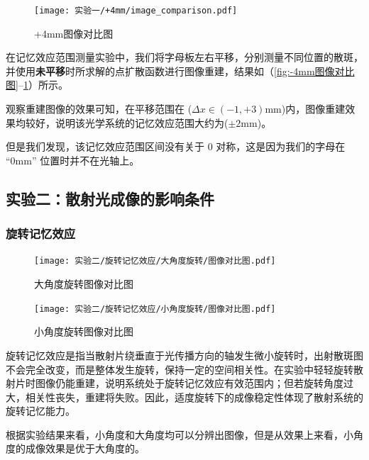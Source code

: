   \begin{figure}[H]
      \centering
      \texttt{[image: 实验一/+4mm/image\_comparison.pdf]}
      \caption{+4mm图像对比图}
      \label{fig:+4mm图像对比图}
  \end{figure}


  在记忆效应范围测量实验中，我们将字母板左右平移，分别测量不同位置的散斑，并使用\textbf{未平移}时所求解的点扩散函数进行图像重建，结果如（\cref{fig:-4mm图像对比图}--\cref{fig:+4mm图像对比图}）所示。

  观察重建图像的效果可知，在平移范围在 ($\Delta x \in (-1, +3) $mm)内，图像重建效果均较好，说明该光学系统的记忆效应范围大约为($\pm 2$mm)。

  但是我们发现，该记忆效应范围区间没有关于 0 对称，这是因为我们的字母在 “0mm” 位置时并不在光轴上。





\subsection{实验二：散射光成像的影响条件}

\subsubsection{旋转记忆效应}
  \begin{figure}[H]
      \centering
      \texttt{[image: 实验二/旋转记忆效应/大角度旋转/图像对比图.pdf]}
      \caption{大角度旋转图像对比图}
  \end{figure}

  \begin{figure}[H]
      \centering
      \texttt{[image: 实验二/旋转记忆效应/小角度旋转/图像对比图.pdf]}
      \caption{小角度旋转图像对比图}
  \end{figure}

  旋转记忆效应是指当散射片绕垂直于光传播方向的轴发生微小旋转时，出射散斑图不会完全改变，而是整体发生旋转，保持一定的空间相关性。在实验中轻轻旋转散射片时图像仍能重建，说明系统处于旋转记忆效应有效范围内；但若旋转角度过大，相关性丧失，重建将失败。因此，适度旋转下的成像稳定性体现了散射系统的旋转记忆能力。

  根据实验结果来看，小角度和大角度均可以分辨出图像，但是从效果上来看，小角度的成像效果是优于大角度的。






